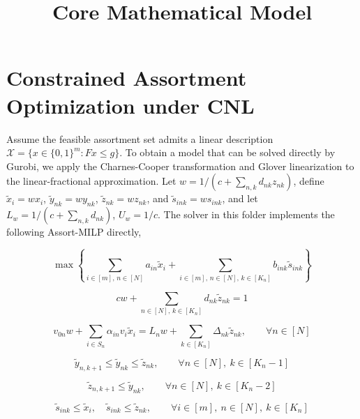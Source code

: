 \documentclass[11pt,a4paper]{article}
\title{Core Mathematical Model}
\date{}
\begin{document}
\maketitle

\section*{Constrained Assortment Optimization under CNL}

Assume the feasible assortment set admits a linear description
$\mathcal{X} = \{x \in \{0,1\}^m : Fx \le g\}$. To obtain a model that can be
solved directly by Gurobi, we apply the Charnes-Cooper transformation and
Glover linearization to the linear-fractional approximation. Let
$w = 1/(c + \sum_{n,k} d_{nk} z_{nk})$, define
$\tilde{x}_i = w x_i$, $\tilde{y}_{nk} = w y_{nk}$,
$\tilde{z}_{nk} = w z_{nk}$, and $\tilde{s}_{ink} = w s_{ink}$, and let
$L_w = 1/(c + \sum_{n,k} d_{nk})$, $U_w = 1/c$.
The solver in this folder implements the following Assort-MILP directly,


\begin{equation}
\max
\left\{
\sum_{i \in [m],\,n \in [N]} a_{in}\tilde{x}_i
+ \sum_{i \in [m],\,n \in [N],\,k \in [K_n]} b_{ink}\tilde{s}_{ink}
\right\}
\tag{Assort-MILP}
\end{equation}

\begin{equation}
c w + \sum_{n \in [N],\,k \in [K_n]} d_{nk}\tilde{z}_{nk} = 1
\tag{6a}
\end{equation}

\begin{equation}
v_{0n} w + \sum_{i \in S_n} \alpha_{in} v_i \tilde{x}_i
= L_n w + \sum_{k \in [K_n]} \Delta_{nk} \tilde{z}_{nk},
\qquad \forall n \in [N]
\tag{6b}
\end{equation}

\begin{equation}
\tilde{y}_{n,k+1} \le \tilde{y}_{nk} \le \tilde{z}_{nk},
\qquad \forall n \in [N],\ k \in [K_n-1]
\tag{7}
\end{equation}

\begin{equation}
\tilde{z}_{n,k+1} \le \tilde{y}_{nk},
\qquad \forall n \in [N],\ k \in [K_n-2]
\tag{8}
\end{equation}

\begin{equation}
\tilde{s}_{ink} \le \tilde{x}_i,
\quad
\tilde{s}_{ink} \le \tilde{z}_{nk},
\qquad \forall i \in [m],\ n \in [N],\ k \in [K_n]
\tag{9}
\end{equation}
\end{document}

